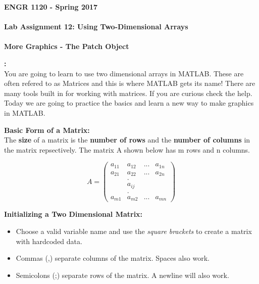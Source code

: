 \documentclass[11pt]{article}
\newcommand{\NUM}{12}
\begin{document}
	\textbf{\LARGE ENGR 1120 - Spring 2017} \\\\
	\textbf{\LARGE Lab Assignment \NUM:  Using Two-Dimensional Arrays}\\\\
	\textbf{\LARGE More Graphics - The Patch Object} \\
	
	\begin{description}
        \vspace{5mm}
		\item [\textbf{ \Large Overview}] \textbf{ \Large :}\\
		
		You are going to learn to use two dimensional arrays in MATLAB. These are often refered to as Matrices and this is where MATLAB gets its name! There are many tools built in for working with matrices. If you are curious check the help. Today we are going to practice the basics and learn a new way to make graphics in MATLAB.

	    \item [\textbf{ \Large }] \textbf{ \Large Basic Form of a Matrix:}\\
	    
	    The {\bf size} of a matrix is the {\bf number of rows} and the  {\bf number of columns} in the matrix repsectively. The matrix A shown below has m rows and n columns.
	    
\Large{
\[ A =\left( \begin{array}{cccc}
a_{11} & a_{12} & ...& a_{1n} \\
a_{21} & a_{22} & ...& a_{2n} \\
&.&&\\
&a_{ij}&&\\
&.&&\\
a_{m1} & a_{m2} & ...& a_{mn}\end{array} \right) \] }
		 
        \item [\textbf{ \Large }] \textbf{ \Large Initializing a Two Dimensional Matrix:}
		\begin{itemize}
	\item Choose a valid variable name and use the {\it square brackets} to create a matrix with hardcoded data.

	\item Commas (,) separate columns of the matrix. Spaces also work.

	\item Semicolons (;) separate rows of the matrix. A newline will also work.


\end{itemize}
\end{description}
\end{document}
